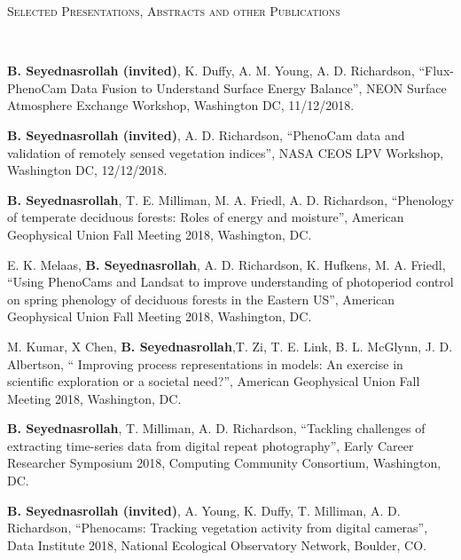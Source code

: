 \documentclass[10pt]{article}
\newenvironment{changemargin}[2]{%
  \begin{list}{}{%
    \setlength{\topsep}{0pt}%
    \setlength{\leftmargin}{#1}%
    \setlength{\rightmargin}{#2}%
    \setlength{\listparindent}{\parindent}%
    \setlength{\itemindent}{\parindent}%
    \setlength{\parsep}{\parskip}%
  }%
  \item[]}{\end{list}
}
\newcommand{\lineover}{
	\begin{changemargin}{-0.05in}{-0.05in}
		\vspace*{-8pt}
		\hrulefill \\
		\vspace*{-2pt}
	\end{changemargin}
}
\newcommand{\header}[1]{
	\begin{changemargin}{-0.5in}{-0.5in}
		\scshape{#1}\\
  	\lineover
	\end{changemargin}
}
\newenvironment{body} {
	\vspace*{-2pt}
	\begin{changemargin}{-0.5in}{-0.5in}
  }
	{\end{changemargin}
}
\begin{document}
\medskip

\header{Selected Presentations, Abstracts and other Publications}

\begin{body}


\textbf{B. Seyednasrollah (invited)}, K. Duffy, A. M. Young, A. D. Richardson, ``Flux-PhenoCam Data Fusion to Understand Surface Energy Balance'', NEON Surface Atmosphere Exchange Workshop, Washington DC, 11/12/2018. \\
\medskip

\textbf{B. Seyednasrollah (invited)}, A. D. Richardson, ``PhenoCam data and validation of remotely sensed vegetation indices'', NASA CEOS LPV Workshop, Washington DC, 12/12/2018. \\
\medskip

\textbf{B. Seyednasrollah}, T. E. Milliman, M. A. Friedl, A. D. Richardson, ``Phenology of temperate deciduous forests: Roles of energy and moisture'', American Geophysical Union Fall Meeting 2018, Washington, DC.\\
\medskip


E. K. Melaas, \textbf{B. Seyednasrollah}, A. D. Richardson, K. Hufkens, M. A. Friedl, ``Using PhenoCams and Landsat to improve understanding of photoperiod control on spring phenology of deciduous forests in the Eastern US'', American Geophysical Union Fall Meeting 2018, Washington, DC.\\
\medskip

M. Kumar, X Chen, \textbf{B. Seyednasrollah},T. Zi, T. E. Link, B. L. McGlynn, J. D. Albertson, `` Improving process representations in models: An exercise in scientific exploration or a societal need?'', American Geophysical Union Fall Meeting 2018, Washington, DC.\\
\medskip
 
 

   \textbf{B. Seyednasrollah}, T. Milliman, A. D. Richardson, ``Tackling challenges of extracting time-series data from digital repeat photography'', Early Career Researcher Symposium 2018, Computing Community Consortium, Washington, DC.\\
\medskip

  \textbf{B. Seyednasrollah (invited)}, A. Young, K. Duffy, T. Milliman, A. D. Richardson, ``Phenocams: Tracking vegetation activity from digital cameras'', Data Institute 2018, National Ecological Observatory Network, Boulder, CO.\\
\medskip


\end{body}
\end{document}
